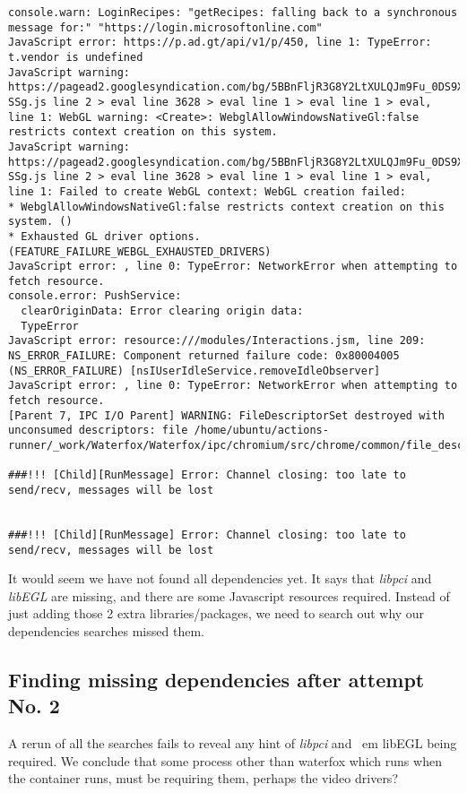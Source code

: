 \documentclass[a4paper]{article}  %
\begin{document}
\begin{tcolorbox}[breakable]
\begin{verbatim}
console.warn: LoginRecipes: "getRecipes: falling back to a synchronous message for:" "https://login.microsoftonline.com"
JavaScript error: https://p.ad.gt/api/v1/p/450, line 1: TypeError: t.vendor is undefined
JavaScript warning: https://pagead2.googlesyndication.com/bg/5BBnFljR3G8Y2LtXULQJm9Fu_0DS9XrGSjZ8CuJ-SSg.js line 2 > eval line 3628 > eval line 1 > eval line 1 > eval, line 1: WebGL warning: <Create>: WebglAllowWindowsNativeGl:false restricts context creation on this system.
JavaScript warning: https://pagead2.googlesyndication.com/bg/5BBnFljR3G8Y2LtXULQJm9Fu_0DS9XrGSjZ8CuJ-SSg.js line 2 > eval line 3628 > eval line 1 > eval line 1 > eval, line 1: Failed to create WebGL context: WebGL creation failed: 
* WebglAllowWindowsNativeGl:false restricts context creation on this system. ()
* Exhausted GL driver options. (FEATURE_FAILURE_WEBGL_EXHAUSTED_DRIVERS)
JavaScript error: , line 0: TypeError: NetworkError when attempting to fetch resource.
console.error: PushService: 
  clearOriginData: Error clearing origin data:
  TypeError
JavaScript error: resource:///modules/Interactions.jsm, line 209: NS_ERROR_FAILURE: Component returned failure code: 0x80004005 (NS_ERROR_FAILURE) [nsIUserIdleService.removeIdleObserver]
JavaScript error: , line 0: TypeError: NetworkError when attempting to fetch resource.
[Parent 7, IPC I/O Parent] WARNING: FileDescriptorSet destroyed with unconsumed descriptors: file /home/ubuntu/actions-runner/_work/Waterfox/Waterfox/ipc/chromium/src/chrome/common/file_descriptor_set_posix.cc:19

###!!! [Child][RunMessage] Error: Channel closing: too late to send/recv, messages will be lost


###!!! [Child][RunMessage] Error: Channel closing: too late to send/recv, messages will be lost

\end{verbatim}
\end{tcolorbox}
It would seem we have not found all dependencies yet. It says that {\em libpci} and {\em libEGL} are missing, and there are some Javascript resources required.
Instead of just adding those 2 extra libraries/packages, we need to search out why our dependencies searches missed them.

\subsection{Finding missing dependencies after attempt No. 2}

A rerun of all the searches fails to reveal any hint of {\em libpci} and {\
em libEGL} being required. We conclude that some process other than waterfox which runs when the container runs, must be requiring them, perhaps the video drivers?
\end{document}
